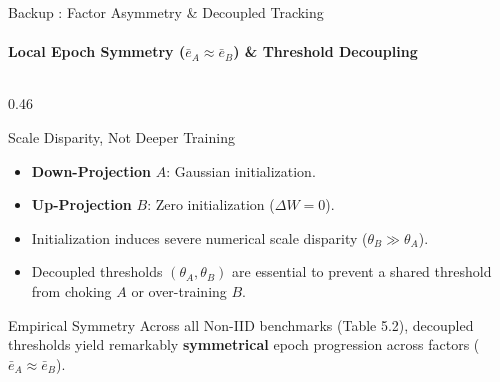 \documentclass[aspectratio=169]{beamer}
\begin{document}
\begin{frame}[noframenumbering, label=backup_factor_asymmetry]{Backup : Factor Asymmetry \& Decoupled Tracking}
    \framesubtitle{Local Epoch Symmetry ($\bar{e}_A \approx \bar{e}_B$) \& Threshold Decoupling \hfill \hyperlink{thank_you}{}}
    \begin{columns}
        \begin{column}{0.46\textwidth}
            \begin{block}{Scale Disparity, Not Deeper Training}
                \scriptsize
                \begin{itemize}
                    \item \textbf{Down-Projection} $A$: Gaussian initialization.
                    \item \textbf{Up-Projection} $B$: Zero initialization ($\Delta W = 0$).
                    \item Initialization induces severe numerical scale disparity ($\theta_B \gg \theta_A$).
                    \item Decoupled thresholds $(\theta_A, \theta_B)$ are essential to prevent a shared threshold from choking $A$ or over-training $B$.
                \end{itemize}
            \end{block}
            
            \begin{exampleblock}{Empirical Symmetry}
                \scriptsize
                Across all Non-IID benchmarks (Table 5.2), decoupled thresholds yield remarkably \textbf{symmetrical} epoch progression across factors ($\bar{e}_A \approx \bar{e}_B$).
            \end{exampleblock}
        \end{column}
        

\end{columns}
\end{frame}
\end{document}
